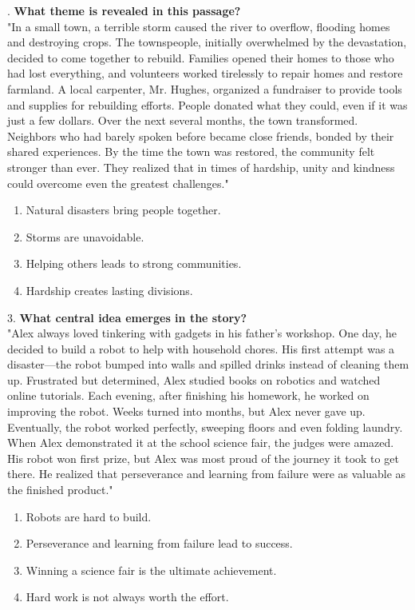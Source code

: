 \documentclass[12pt]{article}
\begin{document}
\vspace{1cm}
. \textbf{What theme is revealed in this passage?\\}
"In a small town, a terrible storm caused the river to overflow, flooding homes and destroying crops. The townspeople, initially overwhelmed by the devastation, decided to come together to rebuild. Families opened their homes to those who had lost everything, and volunteers worked tirelessly to repair homes and restore farmland. A local carpenter, Mr. Hughes, organized a fundraiser to provide tools and supplies for rebuilding efforts. People donated what they could, even if it was just a few dollars. Over the next several months, the town transformed. Neighbors who had barely spoken before became close friends, bonded by their shared experiences. By the time the town was restored, the community felt stronger than ever. They realized that in times of hardship, unity and kindness could overcome even the greatest challenges."  
\begin{enumerate}[label=\Alph*.]
    \item Natural disasters bring people together.  
    \item Storms are unavoidable.  
    \item Helping others leads to strong communities.  
    \item Hardship creates lasting divisions.  
\end{enumerate}

\vspace{1cm}

3. \textbf{What central idea emerges in the story?\\}
"Alex always loved tinkering with gadgets in his father’s workshop. One day, he decided to build a robot to help with household chores. His first attempt was a disaster—the robot bumped into walls and spilled drinks instead of cleaning them up. Frustrated but determined, Alex studied books on robotics and watched online tutorials. Each evening, after finishing his homework, he worked on improving the robot. Weeks turned into months, but Alex never gave up. Eventually, the robot worked perfectly, sweeping floors and even folding laundry. When Alex demonstrated it at the school science fair, the judges were amazed. His robot won first prize, but Alex was most proud of the journey it took to get there. He realized that perseverance and learning from failure were as valuable as the finished product."  
\begin{enumerate}[label=\Alph*.]
    \item Robots are hard to build.  
    \item Perseverance and learning from failure lead to success.  
    \item Winning a science fair is the ultimate achievement.  
    \item Hard work is not always worth the effort.  
\end{enumerate}
\end{document}
